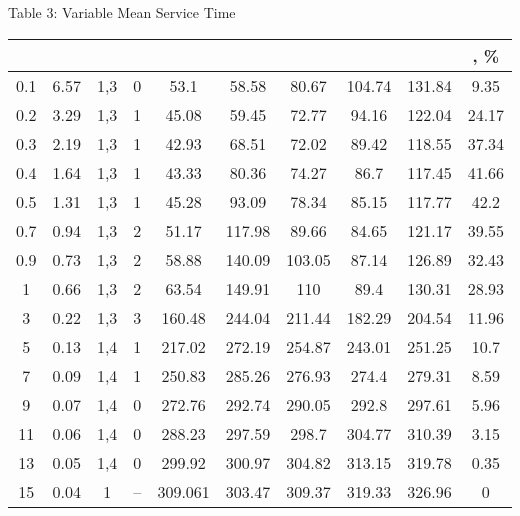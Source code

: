 \documentclass[11pt]{article}
\begin{document}
\begin{center}
Table 3: Variable Mean Service Time
\\ \vspace{2mm}
\begin{tabular}{|c|c|c|c|c|c|c|c|c|c|}
  \hline
&   &     & &  &    &    & & & , \%\\
\hline
0.1&    6.57&   1,3&  0&  53.1&   58.58&  80.67&  104.74& 131.84& 9.35\\
0.2&    3.29&   1,3&  1&  45.08&  59.45&  72.77&  94.16&  122.04& 24.17\\
0.3&    2.19&   1,3&  1&  42.93&  68.51&  72.02&  89.42&  118.55& 37.34\\
0.4&    1.64&   1,3&  1&  43.33&  80.36&  74.27&  86.7&   117.45& 41.66\\
0.5&    1.31&   1,3&  1&  45.28&  93.09&  78.34&  85.15&  117.77& 42.2\\
0.7&    0.94&   1,3&  2&  51.17&  117.98& 89.66&  84.65&  121.17& 39.55\\
0.9&    0.73&   1,3&  2&  58.88&  140.09& 103.05& 87.14&  126.89& 32.43\\
1&  0.66&   1,3&  2&  63.54&  149.91& 110&    89.4&   130.31& 28.93\\
3&  0.22&   1,3&  3&  160.48& 244.04& 211.44& 182.29& 204.54& 11.96\\
5&  0.13&   1,4&  1&  217.02& 272.19& 254.87& 243.01& 251.25& 10.7\\
7&  0.09&   1,4&  1&  250.83& 285.26& 276.93& 274.4&  279.31& 8.59\\
9&  0.07&   1,4&  0&  272.76& 292.74& 290.05& 292.8&  297.61& 5.96\\
11& 0.06&   1,4&  0&  288.23& 297.59& 298.7&  304.77& 310.39& 3.15\\
13& 0.05&   1,4&  0&  299.92& 300.97& 304.82& 313.15& 319.78& 0.35\\
15& 0.04&   1&  --& 309.061&    303.47& 309.37& 319.33& 326.96& 0\\
\hline
\end{tabular}
\end{center}
\end{document}
